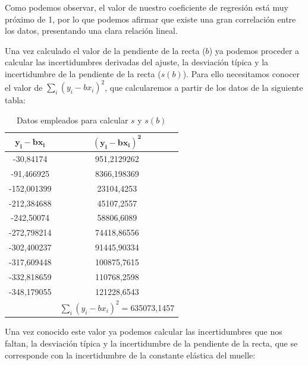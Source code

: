 \documentclass[a4paper,12pt,titlepage]{article}
\begin{document}
Como podemos observar, el valor de nuestro coeficiente de regresión está muy próximo de 1, por lo que podemos afirmar que existe una gran correlación entre los datos, presentando una clara relación lineal.

\par Una vez calculado el valor de la pendiente de la recta ($b$) ya podemos proceder a calcular las incertidumbres derivadas del ajuste, la desviación típica y la incertidumbre de la pendiente de la recta ($s(b)$). Para ello necesitamos conocer el valor de $\sum_i(y_i-bx_i)^2$, que calcularemos a partir de los datos de la siguiente tabla:

\begin{table}[h!]
    \centering
    \begin{tabular}{c|c|}
    \hline
    \multicolumn{1}{|c|}{$\mathbf{y_i-bx_i}$}  & $\mathbf{(y_i-bx_i)^2}$\\ \hline
    \multicolumn{1}{|c|}{-30,84174}   & 951,2129262 \\ \hline
    \multicolumn{1}{|c|}{-91,466925}  & 8366,198369 \\ \hline
    \multicolumn{1}{|c|}{-152,001399} & 23104,4253  \\ \hline
    \multicolumn{1}{|c|}{-212,384688} & 45107,2557  \\ \hline
    \multicolumn{1}{|c|}{-242,50074}  & 58806,6089  \\ \hline
    \multicolumn{1}{|c|}{-272,798214} & 74418,86556 \\ \hline
    \multicolumn{1}{|c|}{-302,400237} & 91445,90334 \\ \hline
    \multicolumn{1}{|c|}{-317,609448} & 100875,7615 \\ \hline
    \multicolumn{1}{|c|}{-332,818659} & 110768,2598 \\ \hline
    \multicolumn{1}{|c|}{-348,179055} & 121228,6543 \\ \hline
                                      & $\sum_i(y_i-bx_i)^2=$635073,1457 \\ \cline{2-2} 
    \end{tabular}
    \caption{Datos empleados para calcular $s$ y $s(b)$}
    \label{tab:my-table}
    \end{table}

\newpage
Una vez conocido este valor ya podemos calcular las incertidumbres que nos faltan, la desviación típica y la incertidumbre de la pendiente de la recta, que se corresponde con la incertidumbre de la constante elástica del muelle:
\end{document}
